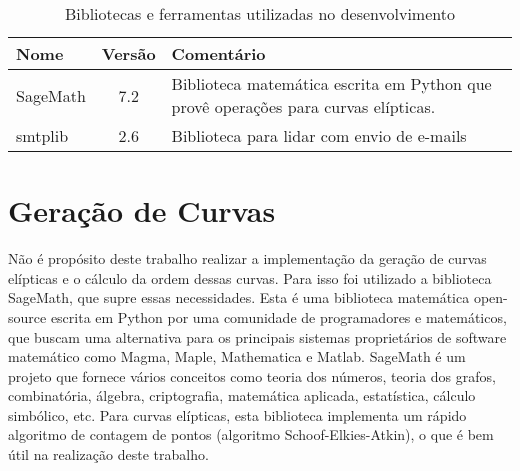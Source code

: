 %
%
%
\begin{table}[!ht]
\centering
    \begin{tabularx}{0.95\textwidth}{lcX}

    \toprule
        \textbf{Nome}  &  \textbf{Versão}  &  \textbf{Comentário}  \\
    \midrule
        SageMath & 7.2 & Biblioteca matemática escrita em Python que provê operações para curvas elípticas.  \\
        \rowcolor[gray]{0.9}
        smtplib  & 2.6  & Biblioteca para lidar com envio de e-mails                                         \\
    \bottomrule

    \end{tabularx}
\caption{Bibliotecas e ferramentas utilizadas no desenvolvimento}
\label{table:libs}

\end{table}

%
%
\section{Geração de Curvas}
Não é propósito deste trabalho realizar a implementação da geração de curvas elípticas e o cálculo da ordem dessas curvas. Para isso foi utilizado a biblioteca SageMath, que supre essas necessidades. Esta é uma biblioteca matemática open-source escrita em Python por uma comunidade de programadores e matemáticos, que buscam uma alternativa para os principais sistemas proprietários de software matemático como Magma, Maple, Mathematica e Matlab. SageMath é um projeto que fornece vários conceitos como teoria dos números, teoria dos grafos, combinatória, álgebra, criptografia, matemática aplicada, estatística, cálculo simbólico, etc. Para curvas elípticas, esta biblioteca implementa um rápido algoritmo de contagem de pontos (algoritmo Schoof-Elkies-Atkin), o que é bem útil na realização deste trabalho.
